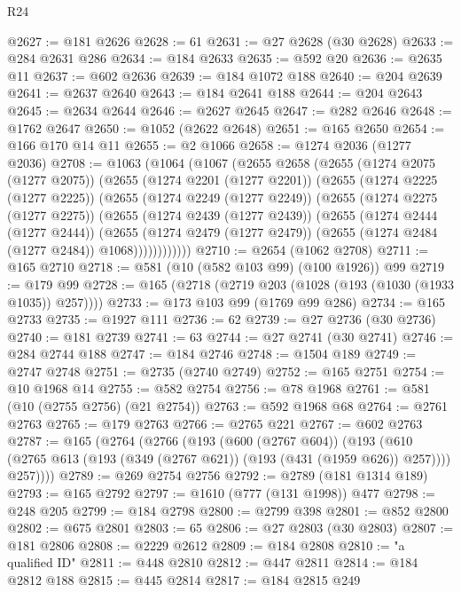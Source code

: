 \begin{lexlean}{R24}
\begin{coremodule}
@2627 := @181 @2626
@2628 := 61
@2631 := @27 @2628 (@30 @2628)
@2633 := @284 @2631 @286
@2634 := @184 @2633
@2635 := @592 @20
@2636 := @2635 @11
@2637 := @602 @2636
@2639 := @184 @1072 @188
@2640 := @204 @2639
@2641 := @2637 @2640
@2643 := @184 @2641 @188
@2644 := @204 @2643
@2645 := @2634 @2644
@2646 := @2627 @2645
@2647 := @282 @2646
@2648 := @1762 @2647
@2650 := @1052 (@2622 @2648)
@2651 := @165 @2650
@2654 := @166 @170 @14 @11
@2655 := @2 @1066
@2658 := @1274 @2036 (@1277 @2036)
@2708 := @1063
    (@1064
      (@1067
        (@2655
          @2658
          (@2655
            (@1274 @2075 (@1277 @2075))
            (@2655
              (@1274 @2201 (@1277 @2201))
              (@2655
                (@1274 @2225 (@1277 @2225))
                (@2655
                  (@1274 @2249 (@1277 @2249))
                  (@2655
                    (@1274 @2275 (@1277 @2275))
                    (@2655
                      (@1274 @2439 (@1277 @2439))
                      (@2655
                        (@1274 @2444 (@1277 @2444))
                        (@2655
                          (@1274 @2479 (@1277 @2479))
                          (@2655 (@1274 @2484 (@1277 @2484)) @1068))))))))))))
@2710 := @2654 (@1062 @2708)
@2711 := @165 @2710
@2718 := @581 (@10 (@582 @103 @99) (@100 @1926)) @99
@2719 := @179 @99
@2728 := @165 (@2718 (@2719 @203 (@1028 (@193 (@1030 (@1933 @1035)) @257))))
@2733 := @173 @103 @99 (@1769 @99 @286)
@2734 := @165 @2733
@2735 := @1927 @111
@2736 := 62
@2739 := @27 @2736 (@30 @2736)
@2740 := @181 @2739
@2741 := 63
@2744 := @27 @2741 (@30 @2741)
@2746 := @284 @2744 @188
@2747 := @184 @2746
@2748 := @1504 @189
@2749 := @2747 @2748
@2751 := @2735 (@2740 @2749)
@2752 := @165 @2751
@2754 := @10 @1968 @14
@2755 := @582 @2754
@2756 := @78 @1968
@2761 := @581 (@10 (@2755 @2756) (@21 @2754))
@2763 := @592 @1968 @68
@2764 := @2761 @2763
@2765 := @179 @2763
@2766 := @2765 @221
@2767 := @602 @2763
@2787 := @165
    (@2764
      (@2766
        (@193
          (@600 (@2767 @604))
          (@193
            (@610 (@2765 @613 (@193 (@349 (@2767 @621)) (@193 (@431 (@1959 @626)) @257))))
            @257))))
@2789 := @269 @2754 @2756
@2792 := @2789 (@181 @1314 @189)
@2793 := @165 @2792
@2797 := @1610 (@777 (@131 @1998)) @477
@2798 := @248 @205
@2799 := @184 @2798
@2800 := @2799 @398
@2801 := @852 @2800
@2802 := @675 @2801
@2803 := 65
@2806 := @27 @2803 (@30 @2803)
@2807 := @181 @2806
@2808 := @2229 @2612
@2809 := @184 @2808
@2810 := "a qualified ID"
@2811 := @448 @2810
@2812 := @447 @2811
@2814 := @184 @2812 @188
@2815 := @445 @2814
@2817 := @184 @2815 @249

\end{coremodule}
\end{lexlean}
